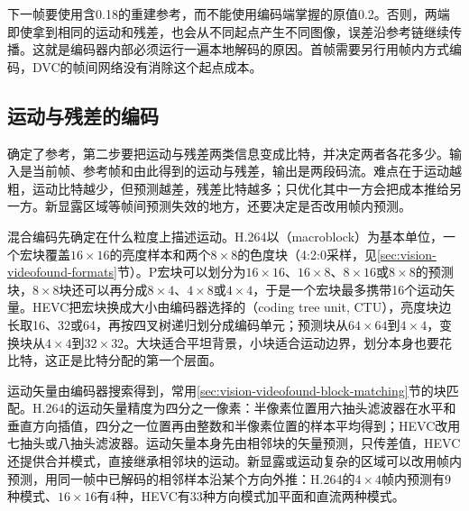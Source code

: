 下一帧要使用含0.18的重建参考，而不能使用编码端掌握的原值0.2。否则，两端即使拿到相同的运动和残差，也会从不同起点产生不同图像，误差沿参考链继续传播。这就是编码器内部必须运行一遍本地解码的原因。首帧需要另行用帧内方式编码，DVC的帧间网络没有消除这个起点成本。

\subsection{运动与残差的编码}
\label{sec:vision-video-rate-allocation}

确定了参考，第二步要把运动与残差两类信息变成比特，并决定两者各花多少。输入是当前帧、参考帧和由此得到的运动与残差，输出是两段码流。难点在于运动越粗，运动比特越少，但预测越差，残差比特越多；只优化其中一方会把成本推给另一方。新显露区域等帧间预测失效的地方，还要决定是否改用帧内预测。

混合编码先确定在什么粒度上描述运动。H.264以（macroblock）为基本单位，一个宏块覆盖$16\times16$的亮度样本和两个$8\times8$的色度块（4:2:0采样，见\ref{sec:vision-videofound-formats}节）。P宏块可以划分为$16\times16$、$16\times8$、$8\times16$或$8\times8$的预测块，$8\times8$块还可以再分成$8\times4$、$4\times8$或$4\times4$，于是一个宏块最多携带16个运动矢量。HEVC把宏块换成大小由编码器选择的（coding tree unit, CTU），亮度块边长取16、32或64，再按四叉树递归划分成编码单元；预测块从$64\times64$到$4\times4$，变换块从$4\times4$到$32\times32$。大块适合平坦背景，小块适合运动边界，划分本身也要花比特，这正是比特分配的第一个层面。

运动矢量由编码器搜索得到，常用\ref{sec:vision-videofound-block-matching}节的块匹配。H.264的运动矢量精度为四分之一像素：半像素位置用六抽头滤波器在水平和垂直方向插值，四分之一位置再由整数和半像素位置的样本平均得到；HEVC改用七抽头或八抽头滤波器。运动矢量本身先由相邻块的矢量预测，只传差值，HEVC还提供合并模式，直接继承相邻块的运动。新显露或运动复杂的区域可以改用帧内预测，用同一帧中已解码的相邻样本沿某个方向外推：H.264的$4\times4$帧内预测有9种模式、$16\times16$有4种，HEVC有33种方向模式加平面和直流两种模式。

